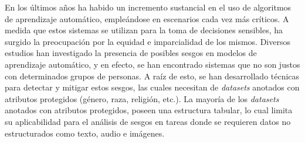 \begin{resumen}
	

	En los \'ultimos a\~nos ha habido un incremento sustancial en el uso de algoritmos de aprendizaje autom\'atico, emple\'andose en
	escenarios cada vez m\'as cr\'iticos. A medida que estos sistemas se utilizan para la toma de decisiones sensibles, ha surgido 
	la preocupaci\'on por la equidad e imparcialidad de los mismos. Diversos estudios han investigado la presencia de posibles sesgos
    en modelos de aprendizaje autom\'atico, y en efecto, se han encontrado sistemas que no son justos con determinados grupos de personas.
	A ra\'iz de esto, se han desarrollado t\'ecnicas para detectar y mitigar estos sesgos, las cuales necesitan de \emph{datasets} anotados
	con atributos protegidos (g\'enero, raza, religi\'on, etc.). La mayor\'ia de los \emph{datasets} anotados con atributos protegidos,
	poseen una estructura tabular, lo cual limita su aplicabilidad para el an\'alisis de sesgos en tareas donde se 
	requieren datos no estructurados como texto, audio e im\'agenes.
	

\end{resumen}
